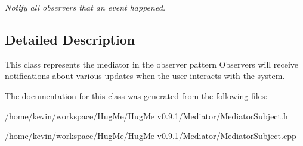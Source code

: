 \begin{DoxyCompactItemize}
\begin{DoxyCompactList}\small\item\em Notify all observers that an event happened. \item\end{DoxyCompactList}\end{DoxyCompactItemize}


\subsection{Detailed Description}
This class represents the mediator in the observer pattern Observers will receive notifications about various updates when the user interacts with the system. 

The documentation for this class was generated from the following files:\begin{DoxyCompactItemize}
\item 
/home/kevin/workspace/HugMe/HugMe v0.9.1/Mediator/MediatorSubject.h\item 
/home/kevin/workspace/HugMe/HugMe v0.9.1/Mediator/MediatorSubject.cpp\end{DoxyCompactItemize}
